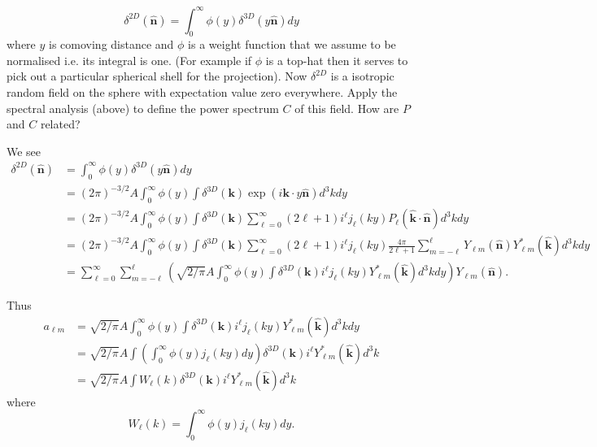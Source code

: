 \documentclass[11pt]{article}
\begin{document}
\begin{equation}
\delta^{2D}(\boldsymbol{\hat{n}}) = \int_0^{\infty} \phi(y) \delta^{3D}(y \boldsymbol{\hat{n}}) dy
\end{equation}
where $y$ is comoving distance and $\phi$ is a weight function that we assume to be normalised i.e. its integral is one. (For example if $\phi$ is a top-hat then it serves to pick out a particular spherical shell for the projection). Now $\delta^{2D}$ is a isotropic random field on the sphere with expectation value zero everywhere. Apply the spectral analysis (above) to define the power spectrum $C$ of this field. How are $P$ and $C$ related?

We see
\begin{equation}
\begin{split}
\delta^{2D}(\boldsymbol{\hat{n}}) &= \int_0^{\infty} \phi(y) \delta^{3D}(y \boldsymbol{\hat{n}}) dy \\
&= (2\pi)^{-3/2} A \int_0^{\infty} \phi(y) \int \delta^{3D}(\boldsymbol{k}) \exp(i \boldsymbol{k} \cdot y\boldsymbol{\hat{n}}) d^3k dy \\
&= (2\pi)^{-3/2} A \int_0^{\infty} \phi(y) \int \delta^{3D}(\boldsymbol{k}) \sum_{\ell=0}^\infty (2 \ell +1) i^{\ell} j_{\ell}(ky) P_{\ell}(\boldsymbol{\hat{k}} \cdot \boldsymbol{\hat{n}}) d^3k dy \\
&= (2\pi)^{-3/2} A \int_0^{\infty} \phi(y) \int \delta^{3D}(\boldsymbol{k}) \sum_{\ell=0}^\infty (2 \ell +1) i^{\ell} j_{\ell}(ky) \frac{4 \pi}{2 \ell + 1}\sum_{m=-\ell}^{\ell} Y_{\ell m}(\boldsymbol{\hat{n}}) Y_{\ell m}^{\ast}(\boldsymbol{\hat{k}}) d^3k dy \\
&= \sum_{\ell=0}^\infty \sum_{m=-\ell}^{\ell} \left( \sqrt{2/\pi} A \int_0^{\infty} \phi(y) \int \delta^{3D}(\boldsymbol{k}) i^{\ell} j_{\ell}(ky)  Y_{\ell m}^{\ast}(\boldsymbol{\hat{k}}) d^3k dy \right) Y_{\ell m}(\boldsymbol{\hat{n}}).
\end{split}
\end{equation}

Thus
\begin{equation}
\begin{split}
a_{\ell m} &= \sqrt{2/\pi} A \int_0^{\infty} \phi(y) \int \delta^{3D}(\boldsymbol{k}) i^{\ell} j_{\ell}(ky)  Y_{\ell m}^{\ast}(\boldsymbol{\hat{k}}) d^3k dy \\
&= \sqrt{2/\pi} A \int \left( \int_0^{\infty} \phi(y) j_{\ell}(ky) dy \right) \delta^{3D}(\boldsymbol{k}) i^{\ell}   Y_{\ell m}^{\ast}(\boldsymbol{\hat{k}}) d^3k  \\
&= \sqrt{2/\pi} A \int W_{\ell}(k) \delta^{3D}(\boldsymbol{k}) i^{\ell}   Y_{\ell m}^{\ast}(\boldsymbol{\hat{k}}) d^3k 
\end{split}
\end{equation}
where
\begin{equation}
W_{\ell}(k) = \int_0^{\infty} \phi(y) j_{\ell}(ky) dy.
\end{equation}
\end{document}
